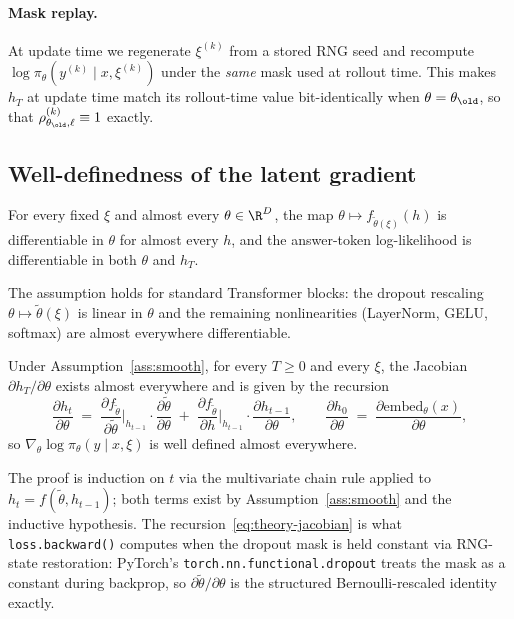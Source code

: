 \paragraph{Mask replay.}
At update time we regenerate $\xi^{(k)}$ from a stored RNG seed and
recompute $\log \pi_\theta(y^{(k)} \mid x, \xi^{(k)})$ under the
\emph{same} mask used at rollout time.  This makes $h_T$ at update
time match its rollout-time value bit-identically when
$\theta = \theta_\old$, so that
$\rho_{\theta_\old, \ell}^{(k)} \equiv 1$ exactly.

\subsection{Well-definedness of the latent gradient}
\label{sec:theory-welldef}

\begin{assumption}\label{ass:smooth}
For every fixed $\xi$ and almost every $\theta \in \R^D$, the map
$\theta \mapsto f_{\tilde\theta(\xi)}(h)$ is differentiable in
$\theta$ for almost every $h$, and the answer-token log-likelihood is
differentiable in both $\theta$ and $h_T$.
\end{assumption}

The assumption holds for standard Transformer blocks: the dropout
rescaling $\theta \mapsto \tilde\theta(\xi)$ is linear in $\theta$ and
the remaining nonlinearities (LayerNorm, GELU, softmax) are almost
everywhere differentiable.

\begin{lemma}
\label{lem:induction}
Under Assumption~\ref{ass:smooth}, for every $T \ge 0$ and every
$\xi$, the Jacobian $\partial h_T / \partial \theta$ exists almost
everywhere and is given by the recursion
\begin{equation}
\frac{\partial h_t}{\partial \theta}
   \;=\;
\frac{\partial f_{\tilde\theta}}{\partial \tilde\theta}\bigg|_{h_{t-1}}
   \cdot \frac{\partial \tilde\theta}{\partial \theta}
   \;+\;
\frac{\partial f_{\tilde\theta}}{\partial h}\bigg|_{h_{t-1}}
   \cdot \frac{\partial h_{t-1}}{\partial \theta},
\qquad
\frac{\partial h_0}{\partial \theta}
   \;=\;
\frac{\partial \mathrm{embed}_\theta(x)}{\partial \theta},
\label{eq:theory-jacobian}
\end{equation}
so $\nabla_\theta \log \pi_\theta(y \mid x, \xi)$ is well defined
almost everywhere.
\end{lemma}

The proof is induction on $t$ via the multivariate chain rule applied
to $h_t = f(\tilde\theta, h_{t-1})$; both terms exist by
Assumption~\ref{ass:smooth} and the inductive hypothesis.  The
recursion~\eqref{eq:theory-jacobian} is what
\texttt{loss.backward()} computes when the dropout mask is held
constant via RNG-state restoration: PyTorch's
\texttt{torch.nn.functional.dropout} treats the mask as a constant
during backprop, so
$\partial \tilde\theta / \partial \theta$ is the structured
Bernoulli-rescaled identity exactly.

